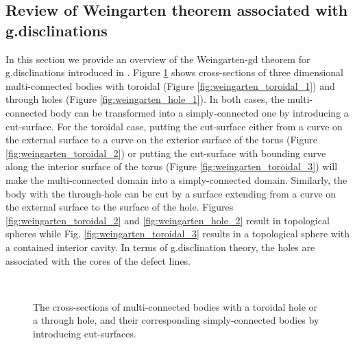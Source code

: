\documentclass[11pt,letterpaper]{article}
\begin{document}
\subsection{Review of Weingarten theorem associated with g.disclinations}\label{sec:weingarten}
In this section we provide an overview of the Weingarten-gd theorem for g.disclinations introduced in \cite{acharya2015continuum}. Figure \ref{fig:multi_body} shows cross-sections of three dimensional multi-connected bodies with toroidal (Figure \ref{fig:weingarten_toroidal_1}) and through holes (Figure \ref{fig:weingarten_hole_1}). In both cases, the multi-connected body can be transformed into a simply-connected one by introducing a cut-surface. For the toroidal case, putting the cut-surface either from a curve on the external surface to a curve on the exterior surface of the torus (Figure \ref{fig:weingarten_toroidal_2}) or putting the cut-surface with bounding curve along the interior surface of the torus (Figure \ref{fig:weingarten_toroidal_3}) will make the multi-connected domain into a simply-connected domain. Similarly, the body with the through-hole can be cut by a surface extending from a curve on the external surface to the surface of the hole. Figures \ref{fig:weingarten_toroidal_2} and \ref{fig:weingarten_hole_2} result in topological spheres while Fig. \ref{fig:weingarten_toroidal_3} results in a topological sphere with a contained interior cavity. In terms of g.disclination theory, the holes are associated with the cores of the defect lines.

\begin{figure}
\centering
{}\qquad
{}
\\
\qquad
{}
\caption{The cross-sections of multi-connected bodies with a toroidal hole or a through hole, and their corresponding simply-connected bodies by introducing cut-surfaces.}
\label{fig:multi_body}
\end{figure}
\end{document}
